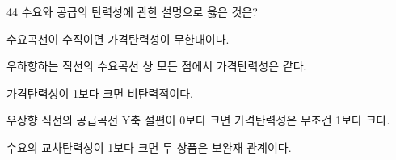 \begin{question}{44}
수요와 공급의 탄력성에 관한 설명으로 옳은 것은?
\begin{choices}
  \item 수요곡선이 수직이면 가격탄력성이 무한대이다.
  \item 우하향하는 직선의 수요곡선 상 모든 점에서 가격탄력성은 같다.
  \item 가격탄력성이 1보다 크면 비탄력적이다.
  \item 우상향 직선의 공급곡선 Y축 절편이 0보다 크면 가격탄력성은 무조건 1보다 크다.
  \item 수요의 교차탄력성이 1보다 크면 두 상품은 보완재 관계이다.
\end{choices}
\end{question}
